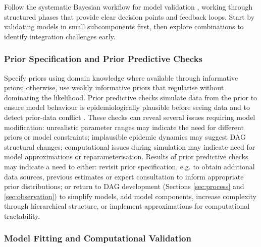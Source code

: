 \documentclass{article}
\begin{document}
Follow the systematic Bayesian workflow for model validation \citep{gelman2020bayesian}, working through structured phases that provide clear decision points and feedback loops.
Start by validating models in small subcomponents first, then explore combinations to identify integration challenges early.

\subsubsection{Prior Specification and Prior Predictive Checks}

Specify priors using domain knowledge where available through informative priors; otherwise, use weakly informative priors that regularise without dominating the likelihood.
Prior predictive checks simulate data from the prior to ensure model behaviour is epidemiologically plausible before seeing data and to detect prior-data conflict \citep{Box1980,yang2025detecting}.
These checks can reveal several issues requiring model modification: unrealistic parameter ranges may indicate the need for different priors or model constraints; implausible epidemic dynamics may suggest DAG structural changes; computational issues during simulation may indicate need for model approximations or reparameterisation.
Results of prior predictive checks may indicate a need to either: revisit prior specification, e.g. to obtain additional data sources, previous estimates or expert consultation to inform appropriate prior distributions; or return to DAG development (Sections \ref{sec:process} and \ref{sec:observation}) to simplify models, add model components, increase complexity through hierarchical structure, or implement approximations for computational tractability.

\subsubsection{Model Fitting and Computational Validation}
\end{document}
